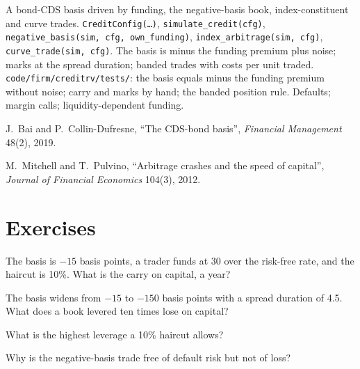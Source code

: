 \begin{build}
 A bond-CDS basis driven by funding, the negative-basis book, index-constituent and curve trades.
 \texttt{CreditConfig(\dots)}, \texttt{simulate\_credit(cfg)}, \texttt{negative\_basis(sim, cfg, own\_funding)},
\texttt{index\_arbitrage(sim, cfg)}, \texttt{curve\_trade(sim, cfg)}.
 The basis is minus the funding premium plus noise; marks at the spread duration; banded trades with costs per unit traded.
 \texttt{code/firm/creditrv/tests/}: the basis equals minus the funding premium without noise; carry and marks by hand; the
banded position rule.
 Defaults; margin calls; liquidity-dependent funding.
\end{build}

\begin{omsources}
\item J.~Bai and P.~Collin-Dufresne, ``The CDS-bond basis'', \emph{Financial Management} 48(2), 2019.
\item M.~Mitchell and T.~Pulvino, ``Arbitrage crashes and the speed of capital'', \emph{Journal of Financial Economics} 104(3), 2012.
\end{omsources}

\section{Exercises}

\begin{exercise}[$\star$]\label{exo:s2:credit-relative-value:1}
The basis is $-15$ basis points, a trader funds at 30 over the risk-free rate, and the haircut is 10\%. What is the carry on capital, a year?
\end{exercise}

\begin{exercise}[$\star$]\label{exo:s2:credit-relative-value:2}
The basis widens from $-15$ to $-150$ basis points with a spread duration of 4.5. What does a book levered ten times lose on capital?
\end{exercise}

\begin{exercise}[$\star$]\label{exo:s2:credit-relative-value:3}
What is the highest leverage a 10\% haircut allows?
\end{exercise}

\begin{exercise}[$\star\star$]\label{exo:s2:credit-relative-value:4}
Why is the negative-basis trade free of default risk but not of loss?
\end{exercise}


